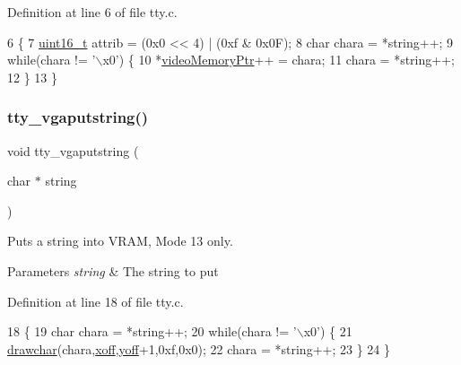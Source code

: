 Definition at line 6 of file tty.\+c.


\begin{DoxyCode}
6                                  \{
7     \hyperlink{a00047_a273cf69d639a59973b6019625df33e30_a273cf69d639a59973b6019625df33e30}{uint16\_t} attrib = (0x0 << 4) | (0xf & 0x0F);
8     \textcolor{keywordtype}{char} chara = *\textcolor{keywordtype}{string}++;
9     \textcolor{keywordflow}{while}(chara != \textcolor{stringliteral}{'\(\backslash\)x0'}) \{
10         *\hyperlink{a00053_a3f896e9c00b9302e2287aad054199134_a3f896e9c00b9302e2287aad054199134}{videoMemoryPtr}++ = chara;
11         chara = *\textcolor{keywordtype}{string}++;
12     \}
13 \}
\end{DoxyCode}
\mbox{\label{a00056_a13ff2c06d56753c5666ca56cb2d81100_a13ff2c06d56753c5666ca56cb2d81100}} 
\subsubsection{\texorpdfstring{tty\+\_\+vgaputstring()}{tty\_vgaputstring()}}
{\footnotesize\ttfamily void tty\+\_\+vgaputstring (\begin{DoxyParamCaption}\item[{char $\ast$}]{string }\end{DoxyParamCaption})}



Puts a string into V\+R\+AM, Mode 13 only. 


\begin{DoxyParams}{Parameters}
{\em string} & The string to put \\
\hline
\end{DoxyParams}


Definition at line 18 of file tty.\+c.


\begin{DoxyCode}
18                                     \{
19     \textcolor{keywordtype}{char} chara = *\textcolor{keywordtype}{string}++;
20     \textcolor{keywordflow}{while}(chara != \textcolor{stringliteral}{'\(\backslash\)x0'}) \{
21         \hyperlink{a00008_a2c8df7a20b47341b70d97a7ff21d86ea_a2c8df7a20b47341b70d97a7ff21d86ea}{drawchar}(chara,\hyperlink{a00053_abaa0d20f0e52ce0d3a7d706f6ac16266_abaa0d20f0e52ce0d3a7d706f6ac16266}{xoff},\hyperlink{a00053_a1a7539764d0ae8cd06ce45c62cf92bca_a1a7539764d0ae8cd06ce45c62cf92bca}{yoff}+1,0xf,0x0);
22         chara = *\textcolor{keywordtype}{string}++;
23     \}
24 \}
\end{DoxyCode}
